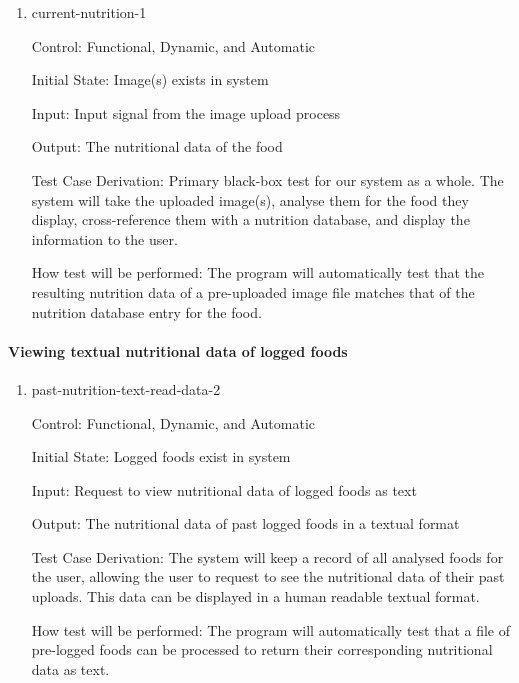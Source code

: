 \documentclass[12pt, titlepage]{article}
\begin{document}
	\begin{enumerate}
		
		\item{current-nutrition-1\\}
		
		Control: Functional, Dynamic, and Automatic
		
		Initial State: Image(s) exists in system
		
		Input: Input signal from the image upload process
		
		Output: The nutritional data of the food
		
		Test Case Derivation: Primary black-box test for our system as a whole. The system will take the uploaded image(s), analyse them for the food they display, cross-reference them with a nutrition database, and display the information to the user.
		
		How test will be performed: The program will automatically test that the resulting nutrition data of a pre-uploaded image file matches that of the nutrition database entry for the food.
		
	\end{enumerate}
	
	\paragraph{Viewing textual nutritional data of logged foods}
	
	\begin{enumerate}
		
		\item{past-nutrition-text-read-data-2\\}
		
		Control: Functional, Dynamic, and Automatic
		
		Initial State: Logged foods exist in system
		
		Input: Request to view nutritional data of logged foods as text
		
		Output: The nutritional data of past logged foods in a textual format
		
		Test Case Derivation: The system will keep a record of all analysed foods for the user, allowing the user to request to see the nutritional data of their past uploads. This data can be displayed in a human readable textual format.
		
		How test will be performed: The program will automatically test that a file of pre-logged foods can be processed to return their corresponding nutritional data as text.
		
	\end{enumerate}
\end{document}
